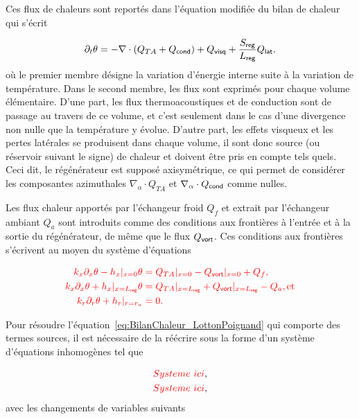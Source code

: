Ces flux de chaleurs sont reportés dans l'équation modifiée du bilan de chaleur qui s'écrit

\begin{equation}
[\Phi\rho_0 C_p + (1-\Phi)\rho_s C_s]\partial_t \theta = - \nabla \cdot (Q_{TA} + Q_{\sf cond}) + Q_{\sf visq} + \frac{S_{\sf reg}}{L_{\sf reg}}Q_{\sf lat},
\label{eq:BilanChaleur_LottonPoignand}
\end{equation}
où le premier membre désigne la variation d'énergie interne suite à la variation de température. Dans le second membre, les flux sont exprimés pour chaque volume élémentaire. D'une part, les flux thermoacoustiques et de conduction sont \og de passage \fg{} au travers de ce volume, et c'est seulement dans le cas d'une divergence non nulle que la température y évolue. D'autre part, les effets visqueux et les pertes latérales se produisent dans chaque volume, il sont donc source (ou réservoir suivant le signe) de chaleur et doivent être pris en compte tels quels. Ceci dit, le régénérateur est supposé axisymétrique, ce qui permet de considérer les composantes azimuthales $\nabla_\alpha \cdot Q_{TA}$ et $\nabla_\alpha \cdot Q_{\sf cond}$ comme nulles.


Les flux chaleur apportés par l'échangeur froid $Q_f$ et extrait par l'échangeur ambiant $Q_a$ sont introduits comme des conditions aux frontières à l'entrée et à la sortie du régénérateur, de même que le flux $Q_{\sf vort}$. Ces conditions aux frontières s'écrivent au moyen du système d'équations

\begin{subequations} \color{red}
	\begin{align}
		k_x \partial_x \theta - h_{x}|_{x=0}\theta &= Q_{TA}|_{x=0} - Q_{\sf vort}|_{x=0} + Q_f, \label{eq:CondFront_x_0Froid}\\
		k_x \partial_x \theta + h_{x}|_{x=L_{\sf reg}}\theta &= Q_{TA}|_{x=L_{\sf reg}}  + Q_{\sf vort}|_{x=L_{\sf reg}} - Q_a, \text{et} \label{eq:CondFront_x_LregAmb}\\
		k_r \partial_r \theta + h_{r}|_{r=r_a} &= 0. \label{eq:CondFront_r_ra}
	\end{align}
	\label{eq:CondFront}%
\end{subequations}



Pour résoudre l'équation~\eqref{eq:BilanChaleur_LottonPoignand} qui comporte des termes sources, il est nécessaire de la réécrire sous la forme d'un système d'équations inhomogènes tel que

\begin{subequations}
	\begin{align}
		\textcolor{red}{Systeme\ ici},\label{eq:1_LottonPoignand}\\
		\textcolor{red}{Systeme\ ici},\label{eq:2_LottonPoignand}
	\end{align}
	\label{eq:SystemeEq_LottonPoignand}
\end{subequations}
avec les changements de variables suivants

